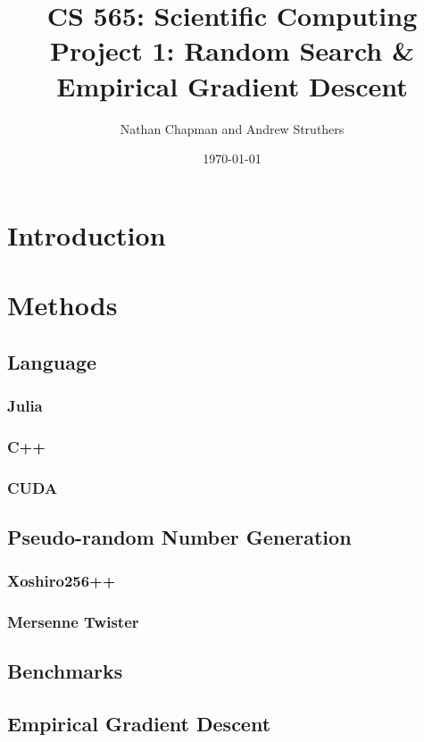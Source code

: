 \documentclass{article}
\title{\vspace*{-0.625in}CS 565: Scientific Computing \\ Project 1: Random Search \& Empirical Gradient Descent\vspace*{-0.25in}}
\author{Nathan Chapman and Andrew Struthers}
\date{\today}
\begin{document}
    \maketitle

    \section{Introduction}

    \section{Methods}

        \subsection{Language}

            \subsubsection{Julia}

            \subsubsection{C++}

            \subsubsection{CUDA}

        \subsection{Pseudo-random Number Generation}

            \subsubsection{Xoshiro256++}

            \subsubsection{Mersenne Twister}

        \subsection{Benchmarks}

        \subsection{Empirical Gradient Descent}
\end{document}
